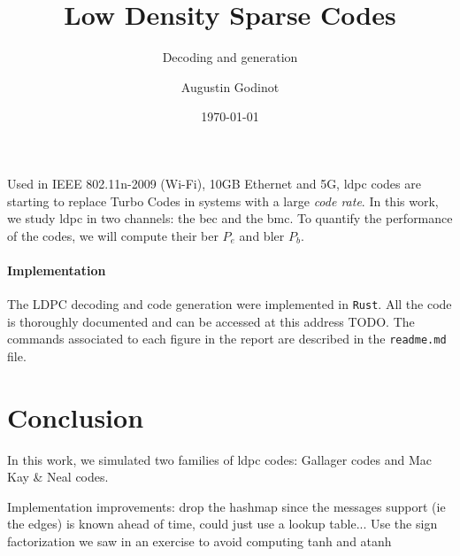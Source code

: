 \documentclass[a4paper]{color-report}
\title{Low Density Sparse Codes}
\author{Augustin Godinot}
\date{\today}
\subtitle{Decoding and generation}
\begin{document}
\maketitle
\tableofcontents
\listoffigures
\listoftables
\printglossary[type=\acronymtype, title=Acronyms]
\newpage

Used in IEEE 802.11n-2009 (Wi-Fi), 10GB Ethernet and 5G, \acrshort{ldpc} codes
are starting to replace Turbo Codes in systems with a large \textit{code rate}.
In this work, we study \acrfull{ldpc} in two channels: the \acrfull{bec} and the
\acrfull{bmc}. To quantify the performance of the codes, we will compute their
\acrfull{ber} $P_e$ and \acrfull{bler} $P_b$.

\paragraph{Implementation} The LDPC decoding and code generation were
implemented in \texttt{Rust}. All the code is thoroughly documented and can be
accessed at this address TODO. The commands associated to each figure in the
report are described in the \texttt{readme.md} file.





\section*{Conclusion}
In this work, we simulated two families of \acrshort{ldpc} codes: Gallager codes
and Mac Kay \& Neal codes.

Implementation improvements: drop the hashmap since the messages support (ie the
edges) is known ahead of time, could just use a lookup table...
Use the sign factorization we saw in an exercise to avoid computing tanh and atanh

\end{document}
